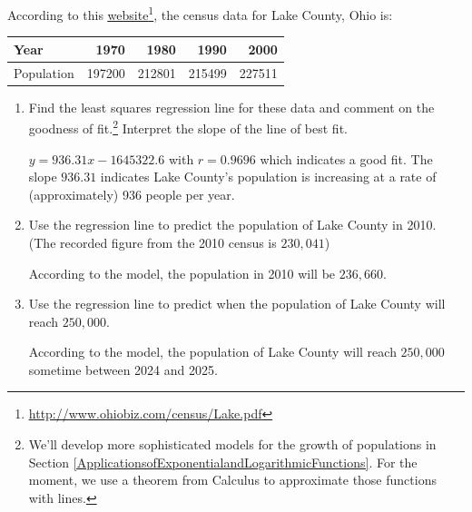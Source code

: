 \documentclass{ximera}
\begin{document}
\begin{problem}
According to this \href{http://www.ohiobiz.com/census/Lake.pdf}{\underline{website}}\footnote{\href{http://www.ohiobiz.com/census/Lake.pdf}{\underline{http://www.ohiobiz.com/census/Lake.pdf}}}, the census data for Lake County, Ohio is:

\begin{tabular}{|l|r|r|r|r|} \hline
Year & 1970 & 1980 & 1990 & 2000 \\
\hline
Population & 197200 & 212801 & 215499 & 227511 \\ \hline
\end{tabular}

\begin{enumerate}


\item  Find the least squares regression line for these data and comment on the goodness of fit.\footnote{We'll develop more sophisticated models for the growth of populations in Section \ref{ApplicationsofExponentialandLogarithmicFunctions}.  For the moment, we use a theorem from Calculus to approximate those functions with lines.} Interpret the slope of the line of best fit.

\begin{solution}
$y = 936.31x - 1645322.6$ with $r=0.9696$ which indicates a good fit.  The slope $936.31$ indicates Lake County's population is increasing at a rate of (approximately) 936 people per year.
\end{solution}

\item  Use the regression line to predict the population of Lake County in 2010.  (The recorded figure from the 2010 census is $230,\!041$)

\begin{solution}
According to the model, the population in 2010 will be $236, \!660$.
\end{solution}

\item  Use the regression line to predict when the population of Lake County will reach $250,\!000$.

\begin{solution}
According to the model, the population of Lake County will reach $250,\!000$ sometime between 2024 and 2025.
\end{solution}

\end{enumerate}
\end{problem}
\end{document}
